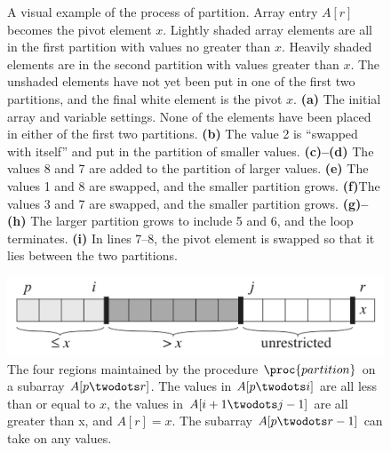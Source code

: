 \documentclass{article}
\begin{document}
\begin{figure}[!ht]
\caption{
    A visual example of the process of partition. Array entry $A[r]$ becomes the pivot element $x$. Lightly shaded array elements are all in the first partition with values no greater than $x$. Heavily shaded elements are in the second partition with values greater than $x$. The unshaded elements have not yet been put in one of the first two partitions, and the final white element is the pivot $x$. 
    \textbf{(a)} The initial array and variable settings. None of the elements have been placed in either of the first two partitions.
    \textbf{(b)} The value 2 is “swapped with itself” and put in the partition of smaller values. 
    \textbf{(c)–(d)} The values 8 and 7 are added to the partition of larger values. 
    \textbf{(e)} The values 1 and 8 are swapped, and the smaller partition grows. 
    \textbf{(f)}The values 3 and 7 are swapped, and the smaller partition grows. 
    \textbf{(g)–(h)} The larger partition grows to include 5 and 6, and the loop terminates. 
    \textbf{(i)} In lines 7–8, the pivot element is swapped so that it lies between the two partitions.
}
\label{fig:quicksort1}
\end{figure}

\clearpage

\begin{figure}[!ht]
\includegraphics[scale=0.25]{partitions}
\caption{
    The four regions maintained by the procedure $\proc{partition}$ on a subarray $A[p \twodots r]$. The values in $A[p \twodots i]$ are all less than or equal to $x$, the values in $A[i+1 \twodots j-1]$ are all greater than x, and $A[r] = x$. The subarray $A[p \twodots r-1]$ can take on any values.
}
\label{fig:quicksort2}
\end{figure}
\end{document}
